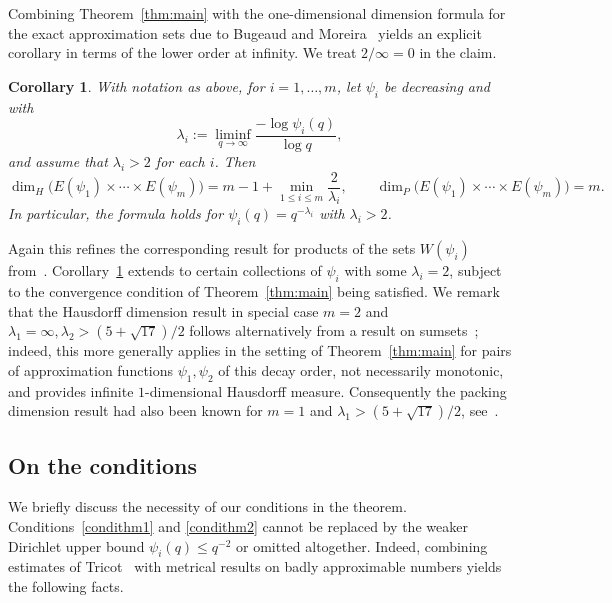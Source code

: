 \documentclass[11pt]{amsart}
\numberwithin{equation}{section}
\newcommand{\0}{\mathbf{0}}
\newtheorem{corollary}{Corollary}
\theoremstyle{remark}
\newcommand{\dimH}{\dim_{H}}
\begin{document}
Combining Theorem~\ref{thm:main} with the one-dimensional dimension formula for the exact
approximation sets due to Bugeaud and Moreira~\cite{BugeaudMoreira2011} yields an explicit corollary in terms of the
lower order at infinity. We treat $2/\infty=0$
in the claim.

\begin{corollary}\label{cor:lowerorder}
With notation as above, for $i=1,\ldots,m$, let
$\psi_i$ be decreasing and with
\begin{equation}  \label{eq:loword}
\lambda_i:=\liminf_{q\to\infty}\frac{-\log \psi_i(q)}{\log q},
\end{equation}
and assume that $\lambda_i>2$ for each $i$.
Then
\[
\dimH\bigl(E(\psi_1)\times\cdots\times E(\psi_m)\bigr)
=
m-1+\min_{1\leq i\leq m}\frac{2}{\lambda_i}, \qquad
\dim_P\bigl(E(\psi_1)\times\cdots\times E(\psi_m)\bigr)
=m.
\]
In particular, the formula holds for $\psi_i(q)=q^{-\lambda_i}$ with $\lambda_i>2$.
\end{corollary}
Again this refines the corresponding result
for products of the sets $W(\psi_i)$ from~\cite{WangWuTAMS}.
Corollary~\ref{cor:lowerorder} extends to certain collections of $\psi_i$
with some $\lambda_i=2$, subject to the convergence condition of Theorem~\ref{thm:main} being satisfied. 
We remark that the Hausdorff dimension result in special case $m=2$ and $\lambda_1=\infty, \lambda_2>(5+\sqrt{17})/2$ follows alternatively from a result on sumsets~\cite[Theorem~3.6]{Joh2023RM}; indeed, this
more generally applies in the setting of Theorem~\ref{thm:main} for pairs of approximation functions $\psi_1, \psi_2$ of this decay order, not necessarily monotonic, and provides infinite $1$-dimensional Hausdorff measure. Consequently the  packing dimension result had also been known for $m=1$ and $\lambda_1>(5+\sqrt{17})/2$, see~\cite[Theorem~3.6]{Joh2023RM}.

\subsection{On the conditions}
We briefly discuss the necessity 
of our conditions in the theorem.
Conditions~\eqref{condithm1} and  \eqref{condithm2} 
cannot be
replaced by the weaker Dirichlet upper bound \(\psi_i(q)\le q^{-2}\) or omitted altogether. 
Indeed, combining estimates of Tricot~\cite{Tricot1982} with metrical results on badly approximable numbers 
yields the following
facts.
\end{document}
